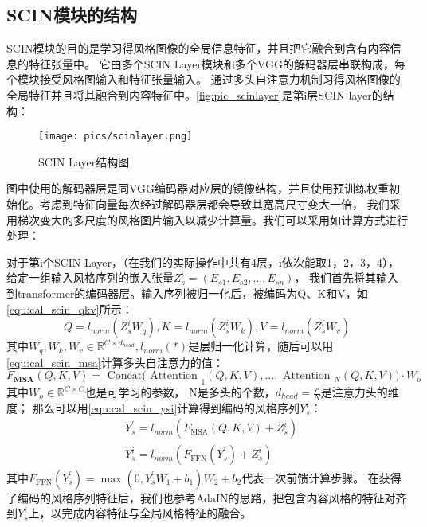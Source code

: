 \subsection{SCIN模块的结构}
SCIN模块的目的是学习得风格图像的全局信息特征，并且把它融合到含有内容信息的特征张量中。
它由多个SCIN Layer模块和多个VGG的解码器层串联构成，每个模块接受风格图输入和特征张量输入。
通过多头自注意力机制习得风格图像的全局特征并且将其融合到内容特征中。\autoref{fig:pic_scinlayer}是第i层SCIN layer的结构：

\begin{figure}[htbp]
    \centering
    \texttt{[image: pics/scinlayer.png]}
    \caption{\label{fig:pic_scinlayer}SCIN Layer结构图}
\end{figure}
图中使用的解码器层是同VGG编码器对应层的镜像结构，并且使用预训练权重初始化。考虑到特征向量每次经过解码器层都会导致其宽高尺寸变大一倍，
我们采用梯次变大的多尺度的风格图片输入以减少计算量。我们可以采用如计算方式进行处理：
\par 对于第i个SCIN Layer，（在我们的实际操作中共有4层，i依次能取1，2，3，4），给定一组输入风格序列的嵌入张量\(Z_{s}^{i}=(E_{s1},E_{s2},\ldots,E_{sn})\)，
我们首先将其输入到transformer的编码器层。输入序列被归一化后，被编码为Q、K和V，如\autoref{equ:cal_scin_qkv}所示：
\begin{equation}
    \label{equ:cal_scin_qkv}
    Q=l_{norm}(Z_{s}^{i}W_{q}),K=l_{norm}(Z_{s}^{i}W_{k}),V=l_{norm}(Z_{s}^{i}W_{v})
\end{equation}
其中\(W_q,W_k,W_v\in\mathbb{R}^{C\times d_{head}},l_{norm}(*)\)是层归一化计算，随后可以用\autoref{equ:cal_scin_msa}计算多头自注意力的值：
\begin{equation}
    \label{equ:cal_scin_msa}
    F_{\mathbf{MSA}}(Q,K,V)=\text{ Concat( Attention }_1(Q,K,V),\ldots,\text{ Attention }_N(Q,K,V))\cdot W_o
\end{equation}
其中$W_o\in\mathbb{R}^{C\times C}$也是可学习的参数， N是多头的个数，\(d_{head}=\frac cN\)是注意力头的维度；
那么可以用\autoref{equ:cal_scin_ysi}计算得到编码的风格序列$Y_s^i$：
\begin{equation}
    \label{equ:cal_scin_ysi}
    \begin{aligned}&Y_s^{\prime}=l_{norm}(F_{\mathrm{MSA}}(Q,K,V)+Z_s^i)\\&Y_s^i=l_{norm}(F_{\mathrm{FFN}}(Y_s^{\prime})+Z_s^i)\end{aligned}
\end{equation}
其中$F_{\mathrm{FFN}}(Y_{s}^{\prime})=\max(0,Y_{s}^{\prime}W_{1}+b_{1})W_{2}+b_{2}$代表一次前馈计算步骤。
在获得了编码的风格序列特征后，我们也参考AdaIN的思路，把包含内容风格的特征对齐到$Y_s^i$上，以完成内容特征与全局风格特征的融合。
